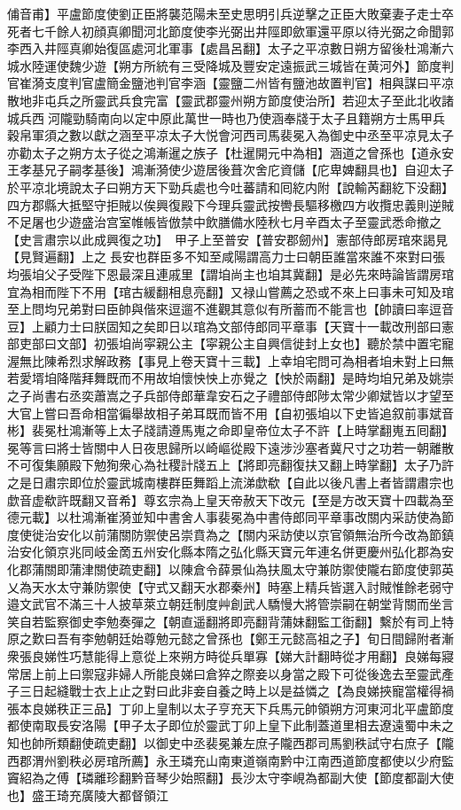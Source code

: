俌音甫】平盧節度使劉正臣將襲范陽未至史思明引兵逆擊之正臣大敗棄妻子走士卒死者七千餘人初顔真卿聞河北節度使李光弼出井陘即歛軍還平原以待光弼之命聞郭李西入井陘真卿始復區處河北軍事【處昌呂翻】太子之平凉數日朔方留後杜鴻漸六城水陸運使魏少遊【朔方所統有三受降城及豐安定遠振武三城皆在黄河外】節度判官崔漪支度判官盧簡金鹽池判官李涵【靈鹽二州皆有鹽池故置判官】相與謀曰平凉散地非屯兵之所靈武兵食完富【靈武郡靈州朔方節度使治所】若迎太子至此北收諸城兵西河隴勁騎南向以定中原此萬世一時也乃使涵奉牋于太子且籍朔方士馬甲兵穀帛軍須之數以獻之涵至平凉太子大悦會河西司馬裴冕入為御史中丞至平凉見太子亦勸太子之朔方太子從之鴻漸暹之族子【杜暹開元中為相】涵道之曾孫也【道永安王孝基兄子嗣孝基後】鴻漸漪使少遊居後葺次舍庀資儲【庀卑婢翻具也】自迎太子於平凉北境說太子曰朔方天下勁兵處也今吐蕃請和囘紇内附【說輸芮翻紇下没翻】四方郡縣大抵堅守拒賊以俟興復殿下今理兵靈武按轡長驅移檄四方收攬忠義則逆賊不足屠也少遊盛治宫室帷帳皆倣禁中飲膳備水陸秋七月辛酉太子至靈武悉命撤之【史言肅宗以此成興復之功】　甲子上至普安【普安郡劒州】憲部侍郎房琯來謁見【見賢遍翻】上之長安也群臣多不知至咸陽謂高力士曰朝臣誰當來誰不來對曰張均張垍父子受陛下恩最深且連戚里【謂垍尚主也垍其冀翻】是必先來時論皆謂房琯宜為相而陛下不用【琯古緩翻相息亮翻】又禄山嘗薦之恐或不來上曰事未可知及琯至上問均兄弟對曰臣帥與偕來逗遛不進觀其意似有所蓄而不能言也【帥讀曰率逗音豆】上顧力士曰朕固知之矣即日以琯為文部侍郎同平章事【天寶十一載改刑部曰憲部吏部曰文部】初張垍尚寜親公主【寜親公主自興信徙封上女也】聽於禁中置宅寵渥無比陳希烈求解政務【事見上卷天寶十三載】上幸垍宅問可為相者垍未對上曰無若愛壻垍降階拜舞既而不用故垍懷怏怏上亦覺之【怏於兩翻】是時均垍兄弟及姚崇之子尚書右丞奕蕭嵩之子兵部侍郎華韋安石之子禮部侍郎陟太常少卿斌皆以才望至大官上嘗曰吾命相當徧舉故相子弟耳既而皆不用【自初張垍以下史皆追叙前事斌音彬】裴冕杜鴻漸等上太子牋請遵馬嵬之命即皇帝位太子不許【上時掌翻嵬五囘翻】冕等言曰將士皆關中人日夜思歸所以崎嶇從殿下遠涉沙塞者冀尺寸之功若一朝離散不可復集願殿下勉狥衆心為社稷計牋五上【將即亮翻復扶又翻上時掌翻】太子乃許之是日肅宗即位於靈武城南樓群臣舞蹈上流涕歔欷【自此以後凡書上者皆謂肅宗也歔音虚欷許既翻又音希】尊玄宗為上皇天帝赦天下改元【至是方改天寶十四載為至德元載】以杜鴻漸崔漪並知中書舍人事裴冕為中書侍郎同平章事改關内采訪使為節度使徙治安化以前蒲關防禦使呂崇賁為之【關内采訪使以京官領無治所今改為節鎮治安化領京兆同岐金啇五州安化縣本隋之弘化縣天寶元年連名併更慶州弘化郡為安化郡蒲關即蒲津關使疏吏翻】以陳倉令薛景仙為扶風太守兼防禦使隴右節度使郭英乂為天水太守兼防禦使【守式又翻天水郡秦州】時塞上精兵皆選入討賊惟餘老弱守邉文武官不滿三十人披草萊立朝廷制度艸創武人驕慢大將管崇嗣在朝堂背關而坐言笑自若監察御史李勉奏彈之【朝直遥翻將即亮翻背蒲妹翻監工衘翻】繫於有司上特原之歎曰吾有李勉朝廷始尊勉元懿之曾孫也【鄭王元懿高祖之子】旬日間歸附者漸衆張良娣性巧慧能得上意從上來朔方時從兵單寡【娣大計翻時從才用翻】良娣每寢常居上前上曰禦寇非婦人所能良娣曰倉猝之際妾以身當之殿下可從後逸去至靈武產子三日起縫戰士衣上止之對曰此非妾自養之時上以是益憐之【為良娣挾寵當權得禍張本良娣秩正三品】丁卯上皇制以太子亨充天下兵馬元帥領朔方河東河北平盧節度都使南取長安洛陽【甲子太子即位於靈武丁卯上皇下此制蓋道里相去遼遠蜀中未之知也帥所類翻使疏吏翻】以御史中丞裴冕兼左庶子隴西郡司馬劉秩試守右庶子【隴西郡渭州劉秩必房琯所薦】永王璘充山南東道嶺南黔中江南西道節度都使以少府監竇紹為之傅【璘離珍翻黔音琴少始照翻】長沙太守李峴為都副大使【節度都副大使也】盛王琦充廣陵大都督領江
